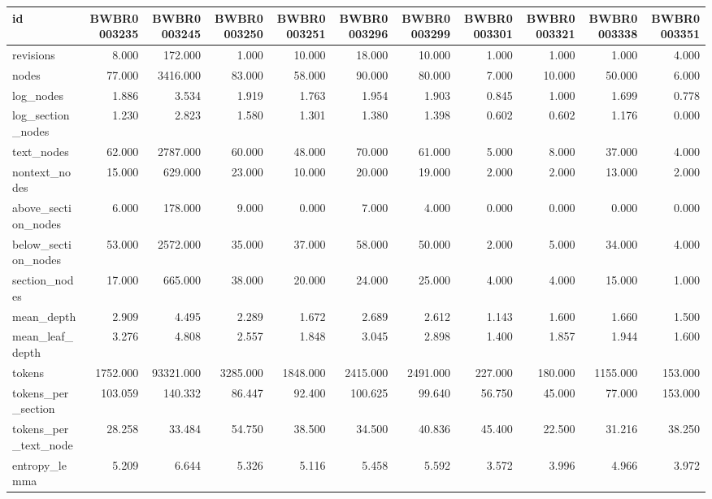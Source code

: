 \begin{tabular}{lrrrrrrrrrr}
\toprule
id & BWBR0003235 & BWBR0003245 & BWBR0003250 & BWBR0003251 & BWBR0003296 & BWBR0003299 & BWBR0003301 & BWBR0003321 & BWBR0003338 & BWBR0003351 \\
\midrule
revisions & 8.000 & 172.000 & 1.000 & 10.000 & 18.000 & 10.000 & 1.000 & 1.000 & 1.000 & 4.000 \\
\cline{1-11}
nodes & 77.000 & 3416.000 & 83.000 & 58.000 & 90.000 & 80.000 & 7.000 & 10.000 & 50.000 & 6.000 \\
\cline{1-11}
log\_nodes & 1.886 & 3.534 & 1.919 & 1.763 & 1.954 & 1.903 & 0.845 & 1.000 & 1.699 & 0.778 \\
\cline{1-11}
log\_section\_nodes & 1.230 & 2.823 & 1.580 & 1.301 & 1.380 & 1.398 & 0.602 & 0.602 & 1.176 & 0.000 \\
\cline{1-11}
text\_nodes & 62.000 & 2787.000 & 60.000 & 48.000 & 70.000 & 61.000 & 5.000 & 8.000 & 37.000 & 4.000 \\
\cline{1-11}
nontext\_nodes & 15.000 & 629.000 & 23.000 & 10.000 & 20.000 & 19.000 & 2.000 & 2.000 & 13.000 & 2.000 \\
\cline{1-11}
above\_section\_nodes & 6.000 & 178.000 & 9.000 & 0.000 & 7.000 & 4.000 & 0.000 & 0.000 & 0.000 & 0.000 \\
\cline{1-11}
below\_section\_nodes & 53.000 & 2572.000 & 35.000 & 37.000 & 58.000 & 50.000 & 2.000 & 5.000 & 34.000 & 4.000 \\
\cline{1-11}
section\_nodes & 17.000 & 665.000 & 38.000 & 20.000 & 24.000 & 25.000 & 4.000 & 4.000 & 15.000 & 1.000 \\
\cline{1-11}
mean\_depth & 2.909 & 4.495 & 2.289 & 1.672 & 2.689 & 2.612 & 1.143 & 1.600 & 1.660 & 1.500 \\
\cline{1-11}
mean\_leaf\_depth & 3.276 & 4.808 & 2.557 & 1.848 & 3.045 & 2.898 & 1.400 & 1.857 & 1.944 & 1.600 \\
\cline{1-11}
tokens & 1752.000 & 93321.000 & 3285.000 & 1848.000 & 2415.000 & 2491.000 & 227.000 & 180.000 & 1155.000 & 153.000 \\
\cline{1-11}
tokens\_per\_section & 103.059 & 140.332 & 86.447 & 92.400 & 100.625 & 99.640 & 56.750 & 45.000 & 77.000 & 153.000 \\
\cline{1-11}
tokens\_per\_text\_node & 28.258 & 33.484 & 54.750 & 38.500 & 34.500 & 40.836 & 45.400 & 22.500 & 31.216 & 38.250 \\
\cline{1-11}
entropy\_lemma & 5.209 & 6.644 & 5.326 & 5.116 & 5.458 & 5.592 & 3.572 & 3.996 & 4.966 & 3.972 \\

\end{tabular}
